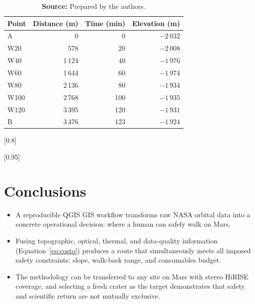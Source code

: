 \documentclass{article}
\begin{document}
\begin{table}[H]
\centering
\caption{Route waypoints and travel times (outbound).}
\label{tab:tiempos}
\small
\begin{tabular}{l r r r}
\toprule
\textbf{Point} & \textbf{Distance (m)} & \textbf{Time (min)} & \textbf{Elevation (m)} \\
\midrule
A    & 0      & 0   & $-2\,032$ \\
W20  & 578    & 20  & $-2\,008$ \\
W40  & 1\,124 & 40  & $-1\,976$ \\
W60  & 1\,644 & 60  & $-1\,974$ \\
W80  & 2\,136 & 80  & $-1\,934$ \\
W100 & 2\,768 & 100 & $-1\,935$ \\
W120 & 3\,395 & 120 & $-1\,931$ \\
B    & 3\,476 & 123 & $-1\,924$ \\
\bottomrule
\end{tabular}
\caption*{\textbf{Source:} Prepared by the authors.}
\end{table}

[0.8]

[0.95]

\newpage

\section*{Conclusions}

\begin{itemize}
    \item A reproducible QGIS GIS workflow transforms raw NASA orbital data into a concrete operational decision: where a human can safely walk on Mars.
    \item Fusing topographic, optical, thermal, and data-quality information (Equation~\ref{eq:costo}) produces a route that simultaneously meets all imposed safety constraints: slope, walk-back range, and consumables budget.
    \item The methodology can be transferred to any site on Mars with stereo HiRISE coverage, and selecting a fresh crater as the target demonstrates that safety and scientific return are not mutually exclusive.
\end{itemize}
\end{document}
